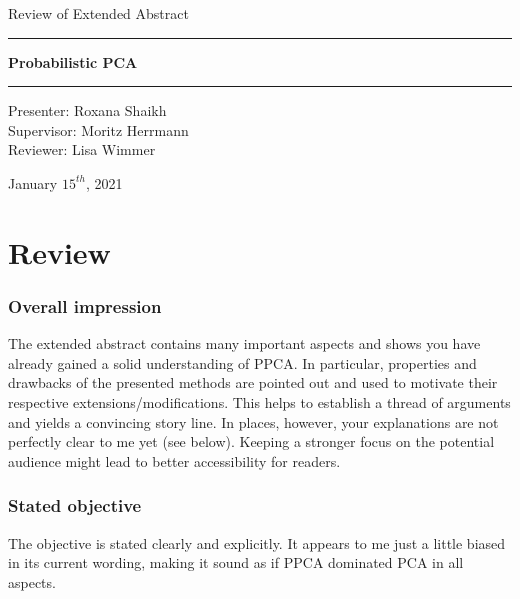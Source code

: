 \documentclass[12pt]{article}
\begin{document}


 
\begin{titlepage}
\begin{center}
    
\LARGE
Review of Extended Abstract
    
\vspace{0.5cm}
      
\rule{\textwidth}{1.5pt}
\LARGE 
\textbf{Probabilistic PCA}
\rule{\textwidth}{1.5pt}
   
\vspace{0.5cm}

\large
Presenter: Roxana Shaikh \\
Supervisor: Moritz Herrmann  \\
Reviewer: Lisa Wimmer \\

\vspace{0.5cm}

January $15^{th}$, 2021

\end{center}
\end{titlepage}



\section*{Review}    

\subsubsection*{Overall impression}

The extended abstract contains many important aspects and shows you have 
already gained a solid understanding of PPCA.
In particular, properties and drawbacks of the presented methods are pointed out 
and used to motivate their respective extensions/modifications.
This helps to establish a thread of arguments and yields a convincing story 
line.
In places, however, your explanations are not perfectly clear to me yet 
(see below).
Keeping a stronger focus on the potential audience might lead to better 
accessibility for readers.

\subsubsection*{Stated objective}
The objective is stated clearly and explicitly.
It appears to me just a little biased in its current wording, making it sound as 
if PPCA dominated PCA in all aspects.
\end{document}
